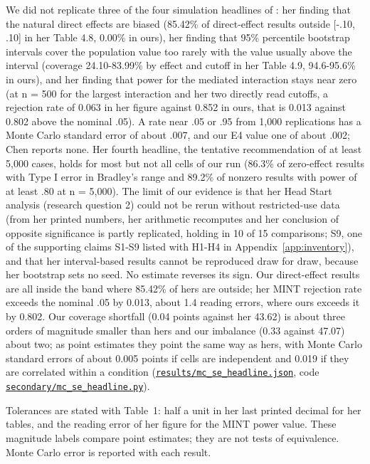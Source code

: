 We did not replicate three of the four simulation headlines of \citet{chen2021}: her finding that the natural direct effects are biased (85.42\% of direct-effect results outside [-.10, .10] in her Table 4.8, 0.00\% in ours), her finding that 95\% percentile bootstrap intervals cover the population value too rarely with the value usually above the interval (coverage 24.10-83.99\% by effect and cutoff in her Table 4.9, 94.6-95.6\% in ours), and her finding that power for the mediated interaction stays near zero (at n = 500 for the largest interaction and her two directly read cutoffs, a rejection rate of 0.063 in her figure against 0.852 in ours, that is 0.013 against 0.802 above the nominal .05). A rate near .05 or .95 from 1,000 replications has a Monte Carlo standard error of about .007, and our E4 value one of about .002; Chen reports none. Her fourth headline, the tentative recommendation of at least 5,000 cases, holds for most but not all cells of our run (86.3\% of zero-effect results with Type I error in Bradley's range and 89.2\% of nonzero results with power of at least .80 at n = 5,000). The limit of our evidence is that her Head Start analysis (research question 2) could not be rerun without restricted-use data (from her printed numbers, her arithmetic recomputes and her conclusion of opposite significance is partly replicated, holding in 10 of 15 comparisons; S9, one of the supporting claims S1-S9 listed with H1-H4 in Appendix~\ref{app:inventory}), and that her interval-based results cannot be reproduced draw for draw, because her bootstrap sets no seed. No estimate reverses its sign. Our direct-effect results are all inside the band where 85.42\% of hers are outside; her MINT rejection rate exceeds the nominal .05 by 0.013, about 1.4 reading errors, where ours exceeds it by 0.802. Our coverage shortfall (0.04 points against her 43.62) is about three orders of magnitude smaller than hers and our imbalance (0.33 against 47.07) about two; as point estimates they point the same way as hers, with Monte Carlo standard errors of about 0.005 points if cells are independent and 0.019 if they are correlated within a condition (\href{https://github.com/alectionary/vibe-math/blob/master/formalization/chen-rdd-mediation/results/mc_se_headline.json}{\nolinkurl{results/mc_se_headline.json}}, code \href{https://github.com/alectionary/vibe-math/blob/master/formalization/chen-rdd-mediation/secondary/mc_se_headline.py}{\nolinkurl{secondary/mc_se_headline.py}}).

Tolerances are stated with Table~1: half a unit in her last printed decimal for her tables, and the reading error of her figure for the MINT power value. These magnitude labels compare point estimates; they are not tests of equivalence. Monte Carlo error is reported with each result.

